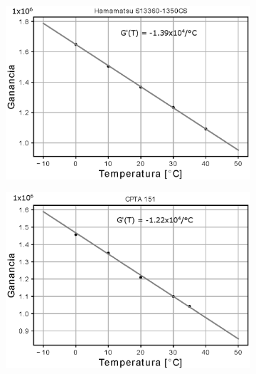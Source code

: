 \begin{figure}[h!]
     \centering
        \caption{Ganancia en función de la temperatura para el SiPM S13360-1350CS de Hamamatsu (izquierda) y CPTA 151 (derecha). La pendiente de la linea recta ajustada a los datos representa el coeficiente de temperatura de la ganancia, siendo $-1.39\times10^4/^\circ$C para el SiPM S13360-1350CS de Hamamatsu y $-1.22\times10^4/^\circ$C para el CPTA 151.}
     \begin{subfigure}[b]{0.49\textwidth}
         \centering
         \includegraphics[width=1.1\textwidth]{Images/GT_1350CS.eps}
         \label{fig:GT_1350CS}
     \end{subfigure}
     \begin{subfigure}[b]{0.49\textwidth}
         \centering
         \includegraphics[width=1.1\textwidth]{Images/GT_CPTA.eps}
         \label{fig:GT_CPTA}
     \end{subfigure}
        \label{fig:Gain_vs_T}
\end{figure}
